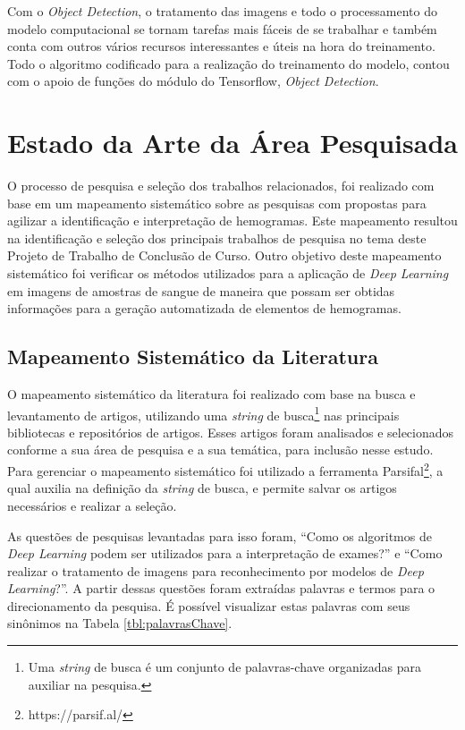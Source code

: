 Com o \emph{Object Detection}, o tratamento das imagens e todo o processamento do modelo computacional se tornam tarefas mais fáceis de se trabalhar e também conta com outros vários recursos interessantes e úteis na hora do treinamento. Todo o algoritmo codificado para a realização do treinamento do modelo, contou com o apoio de funções do módulo do Tensorflow, \emph{Object Detection}.

\chapter{Estado da Arte da Área Pesquisada}
\label{chap:mapeamento}

O processo de pesquisa e seleção dos trabalhos relacionados, foi realizado com base em um mapeamento sistemático sobre as pesquisas com propostas para agilizar a identificação e interpretação de hemogramas. Este mapeamento resultou na identificação e seleção dos principais trabalhos de pesquisa no tema deste Projeto de Trabalho de Conclusão de Curso. Outro objetivo deste mapeamento sistemático foi verificar os métodos utilizados para a aplicação de \emph{Deep Learning} em imagens de amostras de sangue de maneira que possam ser obtidas informações para a geração automatizada de elementos de hemogramas.

\section{Mapeamento Sistemático da Literatura}

O mapeamento sistemático da literatura foi realizado com base na busca e levantamento de artigos, utilizando uma \emph{string} de busca\footnote[1]{Uma \emph{string} de busca é um conjunto de palavras-chave organizadas para auxiliar na pesquisa.} nas principais bibliotecas e repositórios de artigos. Esses artigos foram analisados e selecionados conforme a sua área de pesquisa e a sua temática, para inclusão nesse estudo. Para gerenciar o mapeamento sistemático foi utilizado a ferramenta Parsifal\footnote[2]{https://parsif.al/}, a qual auxilia na definição da \emph{string} de busca, e permite salvar os artigos necessários e realizar a seleção.

As questões de pesquisas levantadas para isso foram, ``Como os algoritmos de \emph{Deep Learning} podem ser utilizados para a interpretação de exames?'' e ``Como realizar o tratamento de imagens para reconhecimento por modelos de \emph{Deep Learning}?''. A partir dessas questões foram extraídas palavras e termos para o direcionamento da pesquisa. É possível visualizar estas palavras com seus sinônimos na Tabela \ref{tbl:palavrasChave}.

